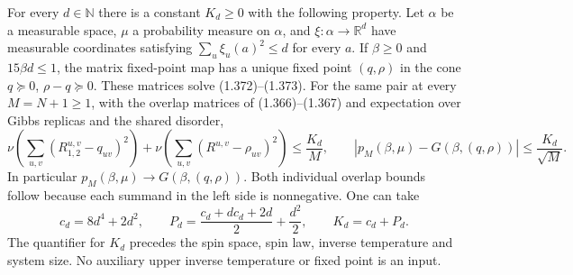 \begin{theorem}\label{thm:sg-tal:vector-high-temperature}
\leanok
{}
For every $d\in\mathbb N$ there is a constant $K_d\ge0$ with the following property.
Let $\alpha$ be a measurable space, $\mu$ a probability measure on $\alpha$, and
$\xi:\alpha\to\mathbb R^d$ have measurable coordinates satisfying
$\sum_u\xi_u(a)^2\le d$ for every $a$. If $\beta\ge0$ and $15\beta d\le1$, the
matrix fixed-point map has a unique fixed point $(q,\rho)$ in the cone
$q\succeq0$, $\rho-q\succeq0$. These matrices solve (1.372)--(1.373).
For the same pair at every $M=N+1\ge1$, with the overlap matrices of
(1.366)--(1.367) and expectation over Gibbs replicas and the shared disorder,
\[
 \nu\!\left(\sum_{u,v}(R_{1,2}^{u,v}-q_{uv})^2\right)
 +\nu\!\left(\sum_{u,v}(R^{u,v}-\rho_{uv})^2\right)\le\frac{K_d}{M},
 \qquad |p_M(\beta,\mu)-G(\beta,(q,\rho))|\le\frac{K_d}{\sqrt M}.
\]
In particular $p_M(\beta,\mu)\to G(\beta,(q,\rho))$. Both individual overlap
bounds follow because each summand in the left side is nonnegative.
One can take
\[
 c_d=8d^4+2d^2,\qquad
 P_d=\frac{c_d+dc_d+2d}{2}+\frac{d^2}{2},\qquad K_d=c_d+P_d.
\]
The quantifier for $K_d$ precedes the spin space, spin law, inverse temperature
and system size. No auxiliary upper inverse temperature or fixed point is an input.
\end{theorem}
